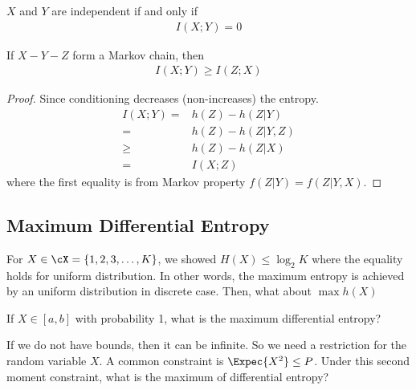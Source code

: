 \documentclass{article}
\begin{document}
\begin{theorem} 
$X$ and $Y$ are independent if and only if
\begin{align}
    I(X;Y)=0
\end{align}  
\end{theorem}

\begin{theorem} 
If $X-Y-Z$ form a Markov chain, then
\begin{align}
    I(X;Y) \ge I(Z;X)
\end{align}  
\end{theorem}

\begin{proof}
    Since conditioning decreases (non-increases) the entropy.
    \begin{align*}
        I(X;Y)=&h(Z)-h(Z|Y)\\
        =& h(Z)-h(Z|Y,Z)\\
        \ge& h(Z)-h(Z|X)\\
        =& I(X;Z)
    \end{align*}
     where the first equality is from Markov property $f(Z|Y)=f(Z|Y,X)$.
\end{proof}

\subsection{Maximum Differential Entropy} \label{sec:intro-cross}
For $X\in \cX=\{1,2,3,\ldots,K\}$, we showed $H(X)\le \log_{2}{K}$ where the equality holds for uniform distribution.
In other words, the maximum entropy is achieved by an uniform distribution in discrete case.
Then, what about $\max h(X)$

\begin{exercise}
    If $X\in[a, b]$ with probability 1, what is the maximum differential entropy?
\end{exercise}

If we do not have bounds, then it can be infinite.
So we need a restriction for the random variable $X$.
A common constraint is $\Expec{X^2} \le P$.
Under this second moment constraint, what is the maximum of differential entropy? 
\end{document}
